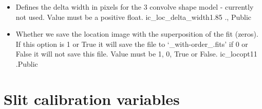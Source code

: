 \begin{itemize}
\item {}
{Defines the delta width in pixels for the 3 convolve shape model - currently not used. Value must be a positive float.}
{ic\_loc\_delta\_width}{1.85}
{\callocRAW}{\constantsfile}{\callocRAW.\progMAIN, \spirouKeywords}{Public}


\item {}
{Whether we save the location image with the superposition of the fit (zeros). If this option is 1 or True it will save the file to `\_with-order\_.fits' if 0 or False it will not save this file. Value must be 1, 0, True or False.}
{ic\_locopt1}{1}
{\callocRAW}{\constantsfile}{\callocRAW.\progMAIN}{Public}


\end{itemize}






\clearpage
\newpage
\section{Slit calibration variables}
\label{ch:variables:slit}

